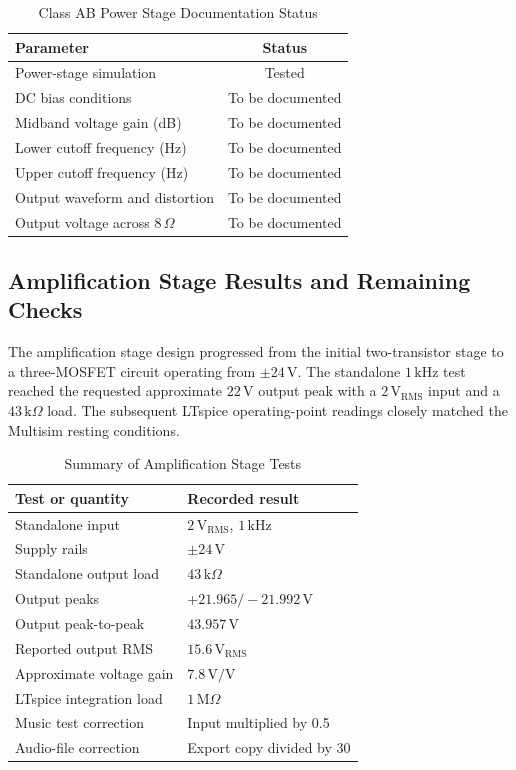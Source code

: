 \documentclass[conference]{IEEEtran}
\begin{document}
\begin{table}[H]
\caption{Class AB Power Stage Documentation Status}
\label{tab:power_status}
\centering
\begin{tabular}{lc}
\toprule
Parameter & Status \\
\midrule
Power-stage simulation & Tested \\
DC bias conditions & To be documented \\
Midband voltage gain (dB) & To be documented \\
Lower cutoff frequency (Hz) & To be documented \\
Upper cutoff frequency (Hz) & To be documented \\
Output waveform and distortion & To be documented \\
Output voltage across $8\,\Omega$ & To be documented \\
\bottomrule
\end{tabular}
\end{table}

\subsection{Amplification Stage Results and Remaining Checks}
The amplification stage design progressed from the initial two-transistor stage to a three-MOSFET circuit operating from $\pm24\,\mathrm{V}$. The standalone $1\,\mathrm{kHz}$ test reached the requested approximate $22\,\mathrm{V}$ output peak with a $2\,\mathrm{V_{RMS}}$ input and a $43\,\mathrm{k}\Omega$ load. The subsequent LTspice operating-point readings closely matched the Multisim resting conditions.

\begin{table}[H]
\caption{Summary of Amplification Stage Tests}
\label{tab:amplification_summary}
\centering
\small
\begin{tabular}{p{}p{}}
\toprule
Test or quantity & Recorded result \\
\midrule
Standalone input & $2\,\mathrm{V_{RMS}}$, $1\,\mathrm{kHz}$ \\
Supply rails & $\pm24\,\mathrm{V}$ \\
Standalone output load & $43\,\mathrm{k}\Omega$ \\
Output peaks & $+21.965 / -21.992\,\mathrm{V}$ \\
Output peak-to-peak & $43.957\,\mathrm{V}$ \\
Reported output RMS & $15.6\,\mathrm{V_{RMS}}$ \\
Approximate voltage gain & $7.8\,\mathrm{V/V}$ \\
LTspice integration load & $1\,\mathrm{M}\Omega$ \\
Music test correction & Input multiplied by 0.5 \\
Audio-file correction & Export copy divided by 30 \\
\bottomrule
\end{tabular}
\end{table}
\end{document}
